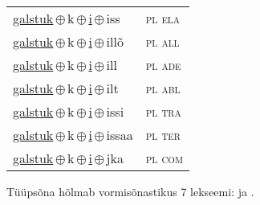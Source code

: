 \begin{minipage}{\textwidth}
\begin{sideways}
\begin{tabular}{l l}
\underline{galstuk}\,$\oplus$\,k\,$\oplus$\,\underline{i}\,$\oplus$\,iss & \textsc{ pl ela } \\
\underline{galstuk}\,$\oplus$\,k\,$\oplus$\,\underline{i}\,$\oplus$\,illõ & \textsc{ pl all } \\
\underline{galstuk}\,$\oplus$\,k\,$\oplus$\,\underline{i}\,$\oplus$\,ill & \textsc{ pl ade } \\
\underline{galstuk}\,$\oplus$\,k\,$\oplus$\,\underline{i}\,$\oplus$\,ilt & \textsc{ pl abl } \\
\underline{galstuk}\,$\oplus$\,k\,$\oplus$\,\underline{i}\,$\oplus$\,issi & \textsc{ pl tra } \\
\underline{galstuk}\,$\oplus$\,k\,$\oplus$\,\underline{i}\,$\oplus$\,issaa & \textsc{ pl ter } \\
\underline{galstuk}\,$\oplus$\,k\,$\oplus$\,\underline{i}\,$\oplus$\,jka & \textsc{ pl com } \\
\end{tabular}
\end{sideways}
\label{tab:tüüpsõnamall-galstukki}

\end{minipage}

 
\vspace{1em}
\noindent Tüüpsõna hõlmab vormisõnastikus 7 lekseemi:  ja .
